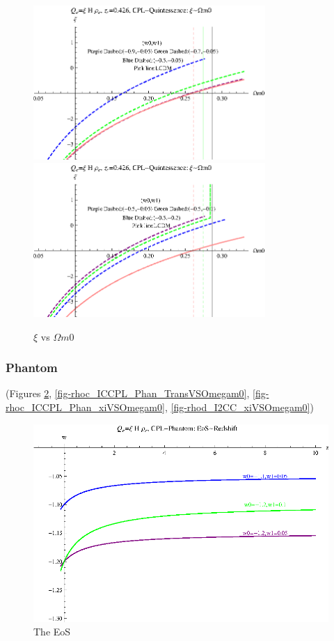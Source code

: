 \documentclass[12pt,a4paper]{article}
\begin{document}
\begin{figure}
\centering
\includegraphics[width=250pt]{rhoc_ICCPL_Quint_xiVSOmegam01.eps}
\includegraphics[width=250pt]{rhoc_ICCPL_Quint_xiVSOmegam02.eps}
\caption{$\xi$ vs $\Omega m0$}\label{fig-rhoc_ICCPL_Quint_xiVSOmegam0}
\end{figure}




\subsubsection{Phantom}

(Figures \ref{fig-rhoc_ICCPL_Phan_EoS}, \ref{fig-rhoc_ICCPL_Phan_TransVSOmegam0}, \ref{fig-rhoc_ICCPL_Phan_xiVSOmegam0}, \ref{fig-rhod_I2CC_xiVSOmegam0})

\begin{figure}
\centering
\includegraphics[width=500pt]{rhoc_ICCPL_Phan_EoS.eps}
\caption{The EoS}\label{fig-rhoc_ICCPL_Phan_EoS}
\end{figure}
\end{document}
